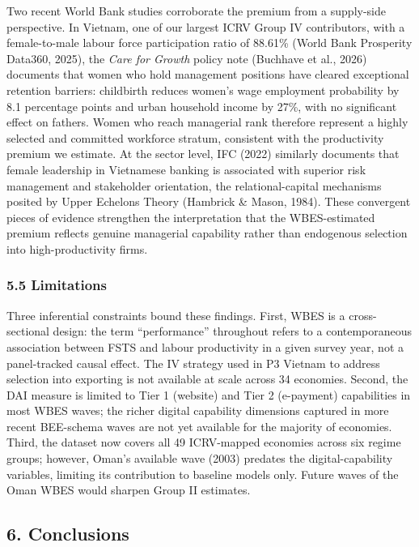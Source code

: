 \documentclass[
  12pt,a4paper]{article}
\begin{document}
Two recent World Bank studies corroborate the premium from a supply-side
perspective. In Vietnam, one of our largest ICRV Group IV contributors,
with a female-to-male labour force participation ratio of 88.61\% (World
Bank Prosperity Data360, 2025), the \emph{Care for Growth} policy note
(Buchhave et al., 2026) documents that women who hold management
positions have cleared exceptional retention barriers: childbirth
reduces women's wage employment probability by 8.1 percentage points and
urban household income by 27\%, with no significant effect on fathers.
Women who reach managerial rank therefore represent a highly selected
and committed workforce stratum, consistent with the productivity
premium we estimate. At the sector level, IFC (2022) similarly documents
that female leadership in Vietnamese banking is associated with superior
risk management and stakeholder orientation, the relational-capital
mechanisms posited by Upper Echelons Theory (Hambrick \& Mason, 1984).
These convergent pieces of evidence strengthen the interpretation that
the WBES-estimated premium reflects genuine managerial capability rather
than endogenous selection into high-productivity firms.

\hypertarget{limitations}{%
\subsubsection{5.5 Limitations}\label{limitations}}

Three inferential constraints bound these findings. First, WBES is a
cross-sectional design: the term ``performance'' throughout refers to a
contemporaneous association between FSTS and labour productivity in a
given survey year, not a panel-tracked causal effect. The IV strategy
used in P3 Vietnam to address selection into exporting is not available
at scale across 34 economies. Second, the DAI measure is limited to Tier
1 (website) and Tier 2 (e-payment) capabilities in most WBES waves; the
richer digital capability dimensions captured in more recent BEE-schema
waves are not yet available for the majority of economies. Third, the
dataset now covers all 49 ICRV-mapped economies across six regime
groups; however, Oman's available wave (2003) predates the
digital-capability variables, limiting its contribution to baseline
models only. Future waves of the Oman WBES would sharpen Group II
estimates.

\hypertarget{conclusions}{%
\subsection{6. Conclusions}\label{conclusions}}
\end{document}
